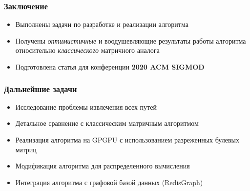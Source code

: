 \documentclass[xcolor=table,english]{beamer}
\begin{document}
\begin{frame}[fragile] \frametitle{Заключение}
    \begin{itemize}
        \item Выполнены задачи по разработке и реализации алгоритма
        \item Получены \textit{оптимистичные} и воодушевляющие результаты работы алгоритма относительно \textit{классического} матричного аналога
        \item Подготовлена статья для конференции \textbf{2020 ACM SIGMOD} 
    \end{itemize}
\end{frame}

\begin{frame}[fragile] \frametitle{Дальнейшие задачи}
  \begin{itemize}
  	\item Исследование проблемы извлечения всех путей
  	\item Детальное сравнение с классическим матричным алгоритмом
  	\item Реализация алгоритма на GPGPU с использованием разреженных булевых матриц
  	\item Модификация алгоритма для распределенного вычисления 
  	\item Интеграция алгоритма с графовой базой данных (RedisGraph)
\end{itemize}
\end{frame}
\end{document}
